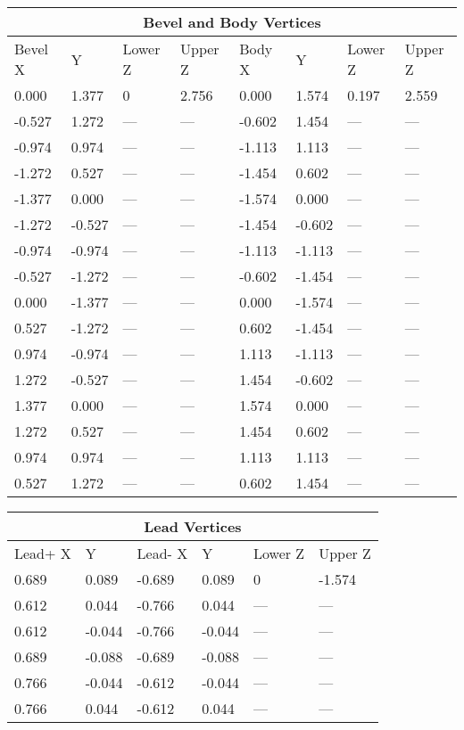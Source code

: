 \documentclass[a4paper]{article}
\begin{document}
\begin{tabular}{|l|l|l|l||l|l|l|l|}
\hline
\multicolumn{8}{|c|}{\textbf{Bevel and Body Vertices}}\\
\hline
Bevel X & Y & Lower Z & Upper Z & Body X & Y & Lower Z & Upper Z\\
\hline
 0.000 &  1.377 & 0    & 2.756 &  0.000 &  1.574 & 0.197 & 2.559\\
-0.527 &  1.272 & ---  & ---   & -0.602 &  1.454 & ---   & ---\\
-0.974 &  0.974 & ---  & ---   & -1.113 &  1.113 & ---   & ---\\
-1.272 &  0.527 & ---  & ---   & -1.454 &  0.602 & ---   & ---\\
-1.377 &  0.000 & ---  & ---   & -1.574 &  0.000 & ---   & ---\\
-1.272 & -0.527 & ---  & ---   & -1.454 & -0.602 & ---   & ---\\
-0.974 & -0.974 & ---  & ---   & -1.113 & -1.113 & ---   & ---\\
-0.527 & -1.272 & ---  & ---   & -0.602 & -1.454 & ---   & ---\\
 0.000 & -1.377 & ---  & ---   &  0.000 & -1.574 & ---   & ---\\
 0.527 & -1.272 & ---  & ---   &  0.602 & -1.454 & ---   & ---\\
 0.974 & -0.974 & ---  & ---   &  1.113 & -1.113 & ---   & ---\\
 1.272 & -0.527 & ---  & ---   &  1.454 & -0.602 & ---   & ---\\
 1.377 &  0.000 & ---  & ---   &  1.574 &  0.000 & ---   & ---\\
 1.272 &  0.527 & ---  & ---   &  1.454 &  0.602 & ---   & ---\\
 0.974 &  0.974 & ---  & ---   &  1.113 &  1.113 & ---   & ---\\
 0.527 &  1.272 & ---  & ---   &  0.602 &  1.454 & ---   & ---\\
\hline
\end{tabular}


\begin{tabular}{|l|l||l|l||l|l|}
\hline
\multicolumn{6}{|c|}{\textbf{Lead Vertices}}\\
\hline
Lead+ X & Y & Lead- X & Y & Lower Z & Upper Z\\
\hline
0.689 &  0.089 & -0.689 &  0.089 & 0   & -1.574\\
0.612 &  0.044 & -0.766 &  0.044 & --- & ---\\
0.612 & -0.044 & -0.766 & -0.044 & --- & ---\\
0.689 & -0.088 & -0.689 & -0.088 & --- & ---\\
0.766 & -0.044 & -0.612 & -0.044 & --- & ---\\
0.766 &  0.044 & -0.612 &  0.044 & --- & ---\\
\hline
\end{tabular}
\end{document}
